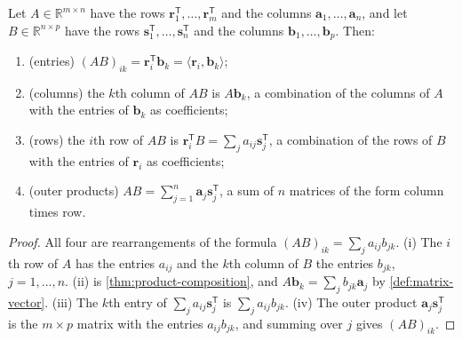 \begin{theorem}
\label{thm:four-readings}
Let $A\in\mathbb R^{m\times n}$ have the rows $\mathbf r_1^{\mathsf T},\ldots,\mathbf r_m^{\mathsf T}$ and the columns $\mathbf a_1,\ldots,\mathbf a_n$, and let $B\in\mathbb R^{n\times p}$ have the rows $\mathbf s_1^{\mathsf T},\ldots,\mathbf s_n^{\mathsf T}$ and the columns $\mathbf b_1,\ldots,\mathbf b_p$. Then:
\begin{enumerate}
\item (entries) $(AB)_{ik}=\mathbf r_i^{\mathsf T}\mathbf b_k=\langle\mathbf r_i,\mathbf b_k\rangle$;
\item (columns) the $k$th column of $AB$ is $A\mathbf b_k$, a combination of the columns of $A$ with the entries of $\mathbf b_k$ as coefficients;
\item (rows) the $i$th row of $AB$ is $\mathbf r_i^{\mathsf T}B=\sum_ja_{ij}\mathbf s_j^{\mathsf T}$, a combination of the rows of $B$ with the entries of $\mathbf r_i$ as coefficients;
\item (outer products) $AB=\sum_{j=1}^n\mathbf a_j\mathbf s_j^{\mathsf T}$, a sum of $n$ matrices of the form column times row.
\end{enumerate}
\end{theorem}

\begin{proof}
All four are rearrangements of the formula $(AB)_{ik}=\sum_ja_{ij}b_{jk}$. (i) The $i$th row of $A$ has the entries $a_{ij}$ and the $k$th column of $B$ the entries $b_{jk}$, $j=1,\ldots,n$. (ii) is \cref{thm:product-composition}, and $A\mathbf b_k=\sum_jb_{jk}\mathbf a_j$ by \cref{def:matrix-vector}. (iii) The $k$th entry of $\sum_ja_{ij}\mathbf s_j^{\mathsf T}$ is $\sum_ja_{ij}b_{jk}$. (iv) The outer product $\mathbf a_j\mathbf s_j^{\mathsf T}$ is the $m\times p$ matrix with the entries $a_{ij}b_{jk}$, and summing over $j$ gives $(AB)_{ik}$.
\end{proof}

